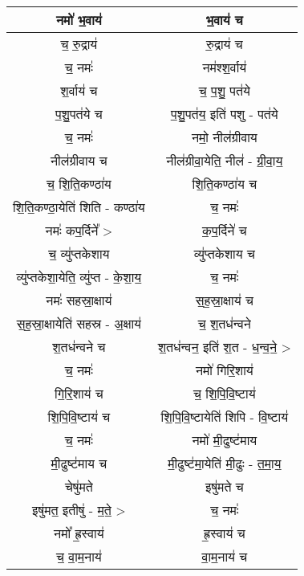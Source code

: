 \subsection{}
{\centering
\begin{longtable}{|c|c|}
\hline
नमो॑ भ॒वाय॑                 & भ॒वाय॑ च\\
\hline
च॒ रु॒द्राय॑                  & रु॒द्राय॑ च\\
\hline
च॒ नमः॑                    & नम॑श्श॒र्वाय॑\\
\hline
श॒र्वाय॑ च                  & च॒ प॒शु॒ पत॑ये\\
\hline
प॒शु॒पत॑ये च                  & प॒शु॒पत॑य॒ इति॑ पशु - पत॑ये\\
\hline
च॒ नमः॑                    & नमो॒ नील॑ग्रीवाय\\
\hline
नील॑ग्रीवाय च              & नील॑ग्रीवा॒येति॒ नील॑ - ग्री॒वा॒य॒\\
\hline
च॒ शि॒ति॒कण्ठा॑य              & शि॒ति॒कण्ठा॑य च\\
\hline
शि॒ति॒कण्ठा॒येति॑ शिति - कण्ठा॑य & च॒ नमः॑\\
\hline
नमः॑ कप॒र्दिने᳚ >             & क॒प॒र्दिने॑ च\\
\hline
च॒ व्यु॑प्तकेशाय               & व्यु॑प्तकेशाय च\\
\hline
व्यु॑प्तकेशा॒येति॒ व्यु॑प्त - के॒शा॒य॒   & च॒ नमः॑\\
\hline
नमः॑ सहस्रा॒क्षाय॑            & स॒ह॒स्रा॒क्षाय॑ च\\
\hline
स॒ह॒स्रा॒क्षायेति॑ सहस्र - अ॒क्षाय॑ & च॒ श॒तध॑न्वने\\
\hline
श॒तध॑न्वने च                 & श॒तध॑न्वन॒ इति॑ श॒त - ध॒न्व॒ने॒ >\\
\hline
च॒ नमः॑                    & नमो॑ गिरि॒शाय॑\\
\hline
गि॒रि॒शाय॑ च                & च॒ शि॒पि॒वि॒ष्टाय॑\\
\hline
शि॒पि॒वि॒ष्टाय॑ च             & शि॒पि॒वि॒ष्टायेति॑ शिपि - वि॒ष्टाय॑\\
\hline
च॒ नमः॑                    & नमो॑ मी॒ढुष्ट॑माय\\
\hline
मी॒ढुष्ट॑माय च               & मी॒ढुष्ट॑मा॒येति॑ मी॒ढुः - त॒मा॒य॒\\
\hline
चेषु॑मते                     & इषु॑मते च\\
\hline
इषु॑मत॒ इतीषु॑ - म॒ते॒ >         & च॒ नमः॑\\
\hline
नमो᳚ ह्र॒स्वाय॑               & ह्र॒स्वाय॑ च\\
\hline
च॒ वा॒म॒नाय॑                 & वा॒म॒नाय॑ च\\

\end{longtable}}
